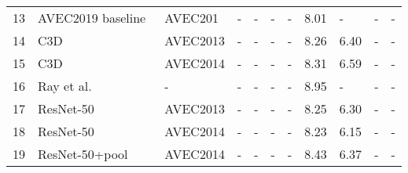 \begin{table*}
\begin{tabular}{l|l|l|llll|ll|ll}
13                                      & AVEC2019 baseline~\cite{ ringeval2019avec}                                                                     & AVEC201                                      & -        & -          & -         & -      & 8.01                     & -                       & -         & -                  \\
14                                      & C3D~\cite{2019Combining}                                                                                       & AVEC2013                                     & -        & -          & -         & -      & 8.26                     & 6.40                    & -         & -                  \\
15                                      & C3D~\cite{2019Combining}                                                                                       & AVEC2014                                     & -        & -          & -         & -      & 8.31                     & 6.59                    & -         & -                  \\
16                                      & Ray et al.~\cite{ray2019multi}                                                                                 & -                                            & -        & -          & -         & -      & 8.95                     & -                       & -         & -                  \\
17                                      & ResNet-50~\cite{2019Depression2}                                                                               & AVEC2013                                     & -        & -          & -         & -      & 8.25                     & 6.30                    & -         & -                  \\
18                                      & ResNet-50~\cite{2019Depression2}                                                                               & AVEC2014                                     & -        & -          & -         & -      & 8.23                     & 6.15                    & -         & -                  \\
19                                      & ResNet-50+pool~\cite{2019Learning}                                                                             & AVEC2014                                     & -        & -          & -         & -      & 8.43                     & 6.37                    & -         & -                  \\

\end{tabular}
\end{table*}
